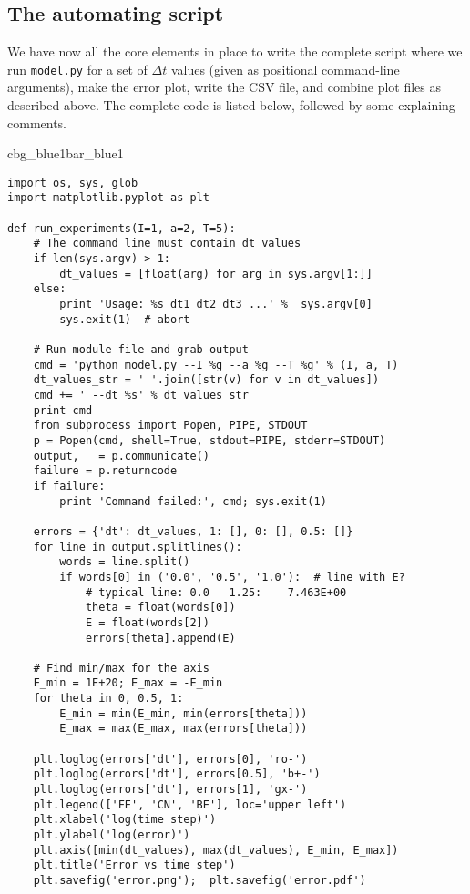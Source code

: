 \documentclass[graybox,sectrefs,envcountresetchap,open=right,final]{svmonodo}
\newenvironment{_pro_tight}[2]{
   \def\FrameCommand{\color{#2}\vrule width 1mm\normalcolor\colorbox{#1}}
   \FrameRule0.6pt\MakeFramed {\advance\hsize-2mm\FrameRestore}\vskip3mm}
   {\vskip0mm\endMakeFramed}
\newenvironment{pro}[2]{
\bgroup\rmfamily
\fboxsep=0mm\relax
\begin{_pro_tight}{#1}{#2}
\list{}{\parsep=-2mm\parskip=0mm\topsep=0pt\leftmargin=2mm
\rightmargin=2\leftmargin\leftmargin=4pt\relax}
\item\relax}
{\endlist\end{_pro_tight}\egroup}
\begin{document}
\subsection{The automating script}

We have now all the core elements in place to write the complete
script where we run
\texttt{model.py} for a set of $\Delta t$ values (given as positional
command-line arguments), make the error plot,
write the CSV file, and combine plot files as described above.
The complete code is listed below, followed by some explaining comments.

\begin{pro}{cbg_blue1}{bar_blue1}\begin{Verbatim}[numbers=none,fontsize=\fontsize{9pt}{9pt},baselinestretch=0.95,xleftmargin=2mm]
import os, sys, glob
import matplotlib.pyplot as plt

def run_experiments(I=1, a=2, T=5):
    # The command line must contain dt values
    if len(sys.argv) > 1:
        dt_values = [float(arg) for arg in sys.argv[1:]]
    else:
        print 'Usage: %s dt1 dt2 dt3 ...' %  sys.argv[0]
        sys.exit(1)  # abort

    # Run module file and grab output
    cmd = 'python model.py --I %g --a %g --T %g' % (I, a, T)
    dt_values_str = ' '.join([str(v) for v in dt_values])
    cmd += ' --dt %s' % dt_values_str
    print cmd
    from subprocess import Popen, PIPE, STDOUT
    p = Popen(cmd, shell=True, stdout=PIPE, stderr=STDOUT)
    output, _ = p.communicate()
    failure = p.returncode
    if failure:
        print 'Command failed:', cmd; sys.exit(1)

    errors = {'dt': dt_values, 1: [], 0: [], 0.5: []}
    for line in output.splitlines():
        words = line.split()
        if words[0] in ('0.0', '0.5', '1.0'):  # line with E?
            # typical line: 0.0   1.25:    7.463E+00
            theta = float(words[0])
            E = float(words[2])
            errors[theta].append(E)

    # Find min/max for the axis
    E_min = 1E+20; E_max = -E_min
    for theta in 0, 0.5, 1:
        E_min = min(E_min, min(errors[theta]))
        E_max = max(E_max, max(errors[theta]))

    plt.loglog(errors['dt'], errors[0], 'ro-')
    plt.loglog(errors['dt'], errors[0.5], 'b+-')
    plt.loglog(errors['dt'], errors[1], 'gx-')
    plt.legend(['FE', 'CN', 'BE'], loc='upper left')
    plt.xlabel('log(time step)')
    plt.ylabel('log(error)')
    plt.axis([min(dt_values), max(dt_values), E_min, E_max])
    plt.title('Error vs time step')
    plt.savefig('error.png');  plt.savefig('error.pdf')


\end{Verbatim}
\end{pro}
\end{document}
